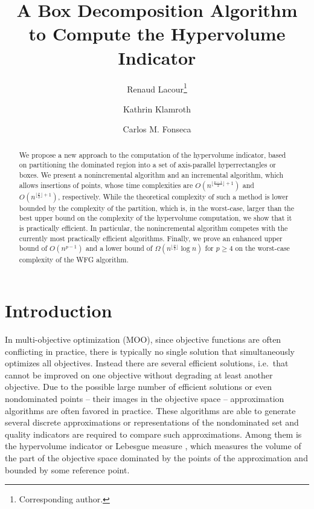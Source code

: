 \documentclass[a4paper,11pt]{article}
\begin{document}
\title{A Box Decomposition Algorithm\\ to Compute the Hypervolume Indicator}
\author[1]{Renaud Lacour\footnote{Corresponding author.}}
\author[1]{Kathrin Klamroth}
\author[2]{Carlos M. Fonseca}
\maketitle


\begin{abstract}
We propose a new approach to the computation of the hypervolume indicator,
based on partitioning the dominated region into a set of axis-parallel hyperrectangles or boxes.
We present a nonincremental algorithm and an incremental algorithm, 
which allows insertions of points,
whose time complexities are $O(n^{\lfloor \frac{p-1}{2} \rfloor+1})$
and $O(n^{\lfloor \frac{p}{2} \rfloor+1})$, respectively.
While the theoretical complexity of such a method is lower bounded
by the complexity of the partition, which is, 
in the worst-case, larger than the best upper bound on 
the complexity of the hypervolume computation,
we show that it is practically efficient.
In particular, the nonincremental algorithm competes with the currently
most practically efficient algorithms.
Finally, we prove an enhanced upper bound of $O(n^{p-1})$
and a lower bound of $\Omega (n^{\lfloor \frac{p}{2}\rfloor} \log n )$
for $p \geq 4$
on the worst-case complexity of the WFG algorithm.

\end{abstract}


\section{Introduction}

In multi-objective optimization (MOO), since objective functions are often conflicting in practice, 
there is typically no single solution that simultaneously optimizes all objectives.
Instead there are several efficient solutions, 
i.e.\  that cannot be improved on one objective without degrading at least another objective.
Due to the possible large number of efficient solutions or even nondominated points 
-- their images in the objective space --
approximation algorithms are often favored in practice.
These algorithms are able to generate several discrete approximations or representations 
of the nondominated set and quality indicators are required to compare such approximations.
Among them is the hypervolume indicator or Lebesgue measure \citep[see e.g.][]{ZitThi98}, 
which measures the volume of the part of the objective space dominated by the points
of the approximation and bounded by some reference point. 
\end{document}
